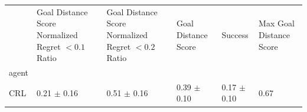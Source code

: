\begin{tabular}{llllll}
\toprule
 & Goal Distance Score Normalized Regret $< 0.1$ Ratio & Goal Distance Score Normalized Regret $< 0.2$ Ratio & Goal Distance Score & Success & Max Goal Distance Score \\
agent &  &  &  &  &  \\
\midrule
CRL & 0.21 $\pm$ 0.16 & 0.51 $\pm$ 0.16 & 0.39 $\pm$ 0.10 & 0.17 $\pm$ 0.10 & 0.67 \\
\bottomrule
\end{tabular}
